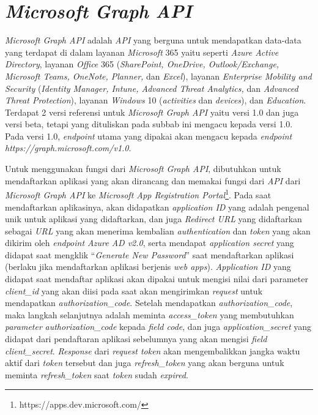 \section{\textit{Microsoft Graph API}}
\label{sec:microsoftgraph}
\textit{Microsoft Graph API} adalah \textit{API} yang berguna untuk mendapatkan data-data yang terdapat di dalam layanan \textit{Microsoft} 365 yaitu seperti \textit{Azure Active Directory}, layanan \textit{Office} 365 (\textit{SharePoint, OneDrive, Outlook/Exchange, Microsoft Teams, OneNote, Planner,} dan \textit{Excel}), layanan \textit{Enterprise Mobility and Security} (\textit{Identity Manager, Intune, Advanced Threat Analytics,} dan \textit{Advanced Threat Protection}), layanan \textit{Windows} 10 (\textit{activities} dan \textit{devices}), dan \textit{Education}. Terdapat 2 versi referensi untuk \textit{Microsoft Graph API} yaitu versi 1.0 dan juga versi beta, tetapi yang dituliskan pada subbab ini mengacu kepada versi 1.0. \cite{microsoft} Pada versi 1.0, \textit{endpoint} utama yang dipakai akan mengacu kepada \textit{endpoint} \textit{https://graph.microsoft.com/v1.0}. 

Untuk menggunakan fungsi dari \textit{Microsoft Graph API}, dibutuhkan untuk mendaftarkan aplikasi yang akan dirancang dan memakai fungsi dari \textit{API} dari \textit{Microsoft Graph API} ke \textit{Microsoft App Registration Portal}\footnote{https://apps.dev.microsoft.com/}. Pada saat mendaftarkan aplikasinya, akan didapatkan \textit{application ID} yang adalah pengenal unik untuk aplikasi yang didaftarkan, dan juga \textit{Redirect URL} yang didaftarkan sebagai \textit{URL} yang akan menerima kembalian \textit{authentication} dan \textit{token} yang akan dikirim oleh \textit{endpoint Azure AD v2.0}, serta mendapat \textit{application secret} yang didapat saat mengklik ``\textit{Generate New Password}'' saat mendaftarkan aplikasi (berlaku jika mendaftarkan aplikasi berjenis \textit{web apps}). \textit{Application ID} yang didapat saat mendaftar aplikasi akan dipakai untuk mengisi nilai dari parameter \textit{client\_id} yang akan diisi pada saat akan mengirimkan \textit{request} untuk mendapatkan \textit{authorization\_code}. Setelah mendapatkan \textit{authorization\_code}, maka langkah selanjutnya adalah meminta \textit{access\_token} yang membutuhkan \textit{parameter} \textit{authorization\_code} kepada \textit{field code}, dan juga \textit{application\_secret} yang didapat dari pendaftaran aplikasi sebelumnya yang akan mengisi \textit{field client\_secret}. \textit{Response} dari \textit{request token} akan mengembalikkan jangka waktu aktif dari \textit{token} tersebut dan juga \textit{refresh\_token} yang akan berguna untuk meminta \textit{refresh\_token} saat \textit{token} sudah \textit{expired}.

